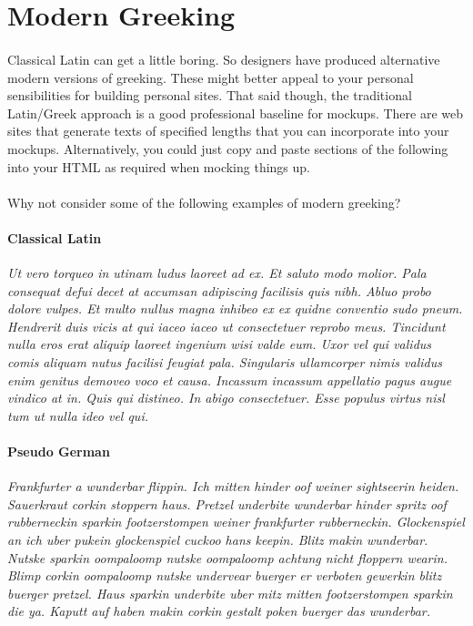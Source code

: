 \section{Modern Greeking}
\paragraph{} Classical Latin can get a little boring. So designers have produced alternative modern versions of greeking. These might better appeal to your personal sensibilities for building personal sites. That said though, the traditional Latin/Greek approach is a good professional baseline for mockups. There are web sites that generate texts of specified lengths that you can incorporate into your mockups. Alternatively, you could just copy and paste sections of the following into your HTML as required when mocking things up.

\paragraph{} Why not consider some of the following examples of modern greeking?

\paragraph{Classical Latin} {\emph{Ut vero torqueo in utinam ludus laoreet ad ex. Et saluto modo molior. Pala consequat defui decet at accumsan adipiscing facilisis quis nibh. Abluo probo dolore vulpes. Et multo nullus magna inhibeo ex ex quidne conventio sudo pneum. Hendrerit duis vicis at qui iaceo iaceo ut consectetuer reprobo meus. Tincidunt nulla eros erat aliquip laoreet ingenium wisi valde eum. Uxor vel qui validus comis aliquam nutus facilisi feugiat pala. Singularis ullamcorper nimis validus enim genitus demoveo voco et causa. Incassum incassum appellatio pagus augue vindico at in. Quis qui distineo. In abigo consectetuer. Esse populus virtus nisl tum ut nulla ideo vel qui.}}

\paragraph{Pseudo German} {\emph{Frankfurter a wunderbar flippin. Ich mitten hinder oof weiner sightseerin heiden. Sauerkraut corkin stoppern haus. Pretzel underbite wunderbar hinder spritz oof rubberneckin sparkin footzerstompen weiner frankfurter rubberneckin. Glockenspiel an ich uber pukein glockenspiel cuckoo hans keepin. Blitz makin wunderbar. Nutske sparkin oompaloomp nutske oompaloomp achtung nicht floppern wearin. Blimp corkin oompaloomp nutske undervear buerger er verboten gewerkin blitz buerger pretzel. Haus sparkin underbite uber mitz mitten footzerstompen sparkin die ya. Kaputt auf haben makin corkin gestalt poken buerger das wunderbar.}}

